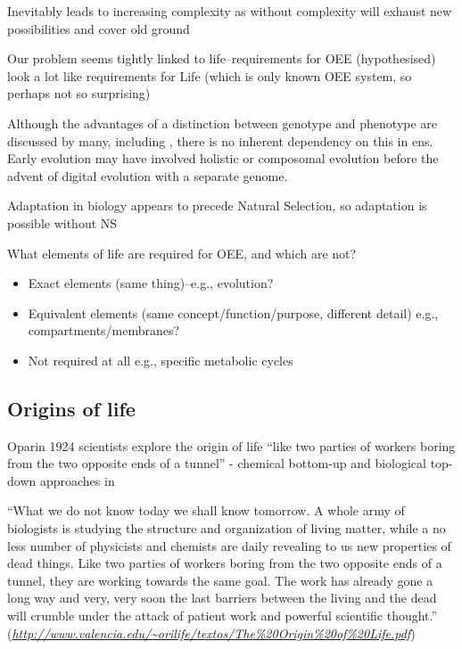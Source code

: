 Inevitably leads to increasing complexity as without complexity will exhaust new possibilities and cover old ground

Our problem seems tightly linked to life--requirements for OEE (hypothesised) look a lot like requirements for Life (which is only known OEE system, so perhaps not so surprising)

Although the advantages of a distinction between genotype and phenotype are discussed by many, including \autocite[section 7.2.3]{Taylor1999}, there is no inherent dependency on this in \gls{ens}. Early evolution may have involved holistic or composomal evolution before the advent of digital evolution with a separate genome.

Adaptation in biology appears to precede Natural Selection, so adaptation is possible without NS \autocite{Watson2010}	      	      	

What elements of life are required for OEE, and which are not?

\begin{itemize}
	\item
	      Exact elements (same thing)--e.g., evolution?
	\item
	      Equivalent elements (same concept/function/purpose, different detail) e.g., compartments/membranes?
	\item
	      Not required at all e.g., specific metabolic cycles
\end{itemize}

\subsection{Origins of life}

Oparin 1924 scientists explore the origin of life ``like two parties
of workers boring from the two opposite ends of a tunnel'' - chemical
bottom-up and biological top-down approaches in \autocite{Pereto2012}


``What we do not know today we shall know tomorrow. A
whole army of biologists is studying the structure and organization of
living matter, while a no less number of physicists and chemists are
daily revealing to us new properties of dead things. Like two parties
of workers boring from the two opposite ends of a tunnel, they are
working towards the same goal. The work has already gone a long way
and very, very soon the last barriers between the living and the dead
will crumble under the attack of patient work and powerful scientific
thought.'' (\href{http://www.valencia.edu/~orilife/textos/The\%20Origin\%20of\%20Life.pdf}{\emph{http://www.valencia.edu/\textasciitilde{}orilife/textos/The\%20Origin\%20of\%20Life.pdf}})
			
